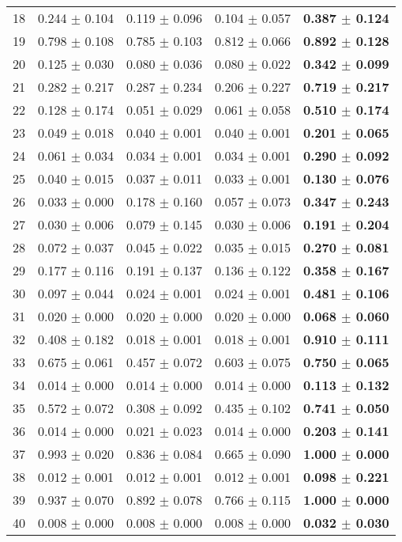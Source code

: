 \begin{table}[!ht]
{\begin{tabular}{r c c c c}
18 & 0.244 $\pm$ 0.104 & 0.119 $\pm$ 0.096 & 0.104 $\pm$ 0.057 & \textbf{0.387 $\pm$ 0.124} \\
19 & 0.798 $\pm$ 0.108 & 0.785 $\pm$ 0.103 & 0.812 $\pm$ 0.066 & \textbf{0.892 $\pm$ 0.128} \\
20 & 0.125 $\pm$ 0.030 & 0.080 $\pm$ 0.036 & 0.080 $\pm$ 0.022 & \textbf{0.342 $\pm$ 0.099} \\
21 & 0.282 $\pm$ 0.217 & 0.287 $\pm$ 0.234 & 0.206 $\pm$ 0.227 & \textbf{0.719 $\pm$ 0.217} \\
22 & 0.128 $\pm$ 0.174 & 0.051 $\pm$ 0.029 & 0.061 $\pm$ 0.058 & \textbf{0.510 $\pm$ 0.174} \\
23 & 0.049 $\pm$ 0.018 & 0.040 $\pm$ 0.001 & 0.040 $\pm$ 0.001 & \textbf{0.201 $\pm$ 0.065} \\
24 & 0.061 $\pm$ 0.034 & 0.034 $\pm$ 0.001 & 0.034 $\pm$ 0.001 & \textbf{0.290 $\pm$ 0.092} \\
25 & 0.040 $\pm$ 0.015 & 0.037 $\pm$ 0.011 & 0.033 $\pm$ 0.001 & \textbf{0.130 $\pm$ 0.076} \\
26 & 0.033 $\pm$ 0.000 & 0.178 $\pm$ 0.160 & 0.057 $\pm$ 0.073 & \textbf{0.347 $\pm$ 0.243} \\
27 & 0.030 $\pm$ 0.006 & 0.079 $\pm$ 0.145 & 0.030 $\pm$ 0.006 & \textbf{0.191 $\pm$ 0.204} \\
28 & 0.072 $\pm$ 0.037 & 0.045 $\pm$ 0.022 & 0.035 $\pm$ 0.015 & \textbf{0.270 $\pm$ 0.081} \\
29 & 0.177 $\pm$ 0.116 & 0.191 $\pm$ 0.137 & 0.136 $\pm$ 0.122 & \textbf{0.358 $\pm$ 0.167} \\
30 & 0.097 $\pm$ 0.044 & 0.024 $\pm$ 0.001 & 0.024 $\pm$ 0.001 & \textbf{0.481 $\pm$ 0.106} \\
31 & 0.020 $\pm$ 0.000 & 0.020 $\pm$ 0.000 & 0.020 $\pm$ 0.000 & \textbf{0.068 $\pm$ 0.060} \\
32 & 0.408 $\pm$ 0.182 & 0.018 $\pm$ 0.001 & 0.018 $\pm$ 0.001 & \textbf{0.910 $\pm$ 0.111} \\
33 & 0.675 $\pm$ 0.061 & 0.457 $\pm$ 0.072 & 0.603 $\pm$ 0.075 & \textbf{0.750 $\pm$ 0.065} \\
34 & 0.014 $\pm$ 0.000 & 0.014 $\pm$ 0.000 & 0.014 $\pm$ 0.000 & \textbf{0.113 $\pm$ 0.132} \\
35 & 0.572 $\pm$ 0.072 & 0.308 $\pm$ 0.092 & 0.435 $\pm$ 0.102 & \textbf{0.741 $\pm$ 0.050} \\
36 & 0.014 $\pm$ 0.000 & 0.021 $\pm$ 0.023 & 0.014 $\pm$ 0.000 & \textbf{0.203 $\pm$ 0.141} \\
37 & 0.993 $\pm$ 0.020 & 0.836 $\pm$ 0.084 & 0.665 $\pm$ 0.090 & \textbf{1.000 $\pm$ 0.000} \\
38 & 0.012 $\pm$ 0.001 & 0.012 $\pm$ 0.001 & 0.012 $\pm$ 0.001 & \textbf{0.098 $\pm$ 0.221} \\
39 & 0.937 $\pm$ 0.070 & 0.892 $\pm$ 0.078 & 0.766 $\pm$ 0.115 & \textbf{1.000 $\pm$ 0.000} \\
40 & 0.008 $\pm$ 0.000 & 0.008 $\pm$ 0.000 & 0.008 $\pm$ 0.000 & \textbf{0.032 $\pm$ 0.030} \\
\end{tabular}}
\end{table}
